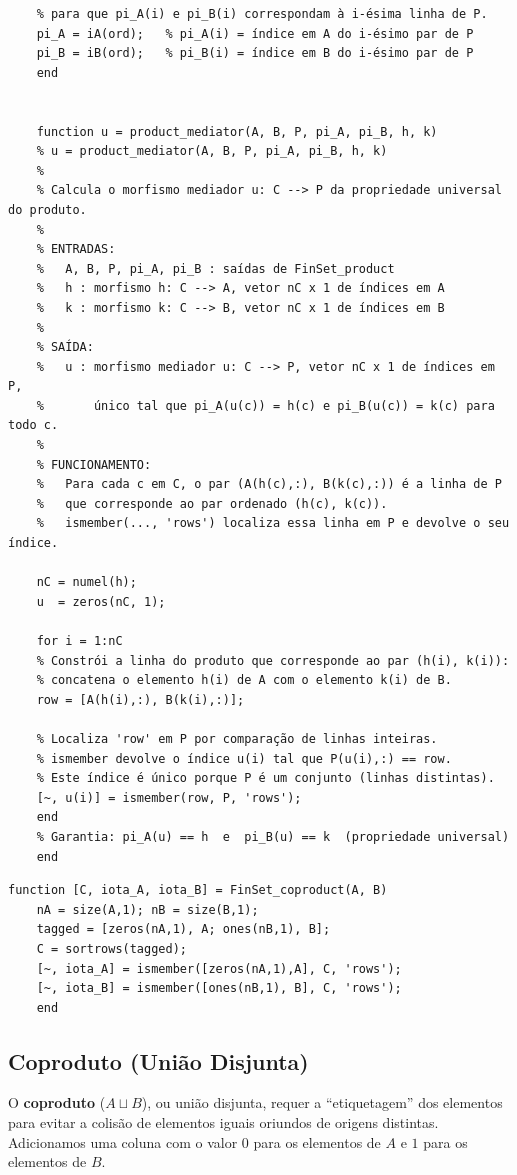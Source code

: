 \begin{lstlisting}[style=matlab, caption={Produto Categórico em FinSet com verificação da propriedade universal}]
	% Reordena os índices de projeção de acordo com a permutação de sortrows,
	% para que pi_A(i) e pi_B(i) correspondam à i-ésima linha de P.
	pi_A = iA(ord);   % pi_A(i) = índice em A do i-ésimo par de P
	pi_B = iB(ord);   % pi_B(i) = índice em B do i-ésimo par de P
	end
	
	
	function u = product_mediator(A, B, P, pi_A, pi_B, h, k)
	% u = product_mediator(A, B, P, pi_A, pi_B, h, k)
	%
	% Calcula o morfismo mediador u: C --> P da propriedade universal do produto.
	%
	% ENTRADAS:
	%   A, B, P, pi_A, pi_B : saídas de FinSet_product
	%   h : morfismo h: C --> A, vetor nC x 1 de índices em A
	%   k : morfismo k: C --> B, vetor nC x 1 de índices em B
	%
	% SAÍDA:
	%   u : morfismo mediador u: C --> P, vetor nC x 1 de índices em P,
	%       único tal que pi_A(u(c)) = h(c) e pi_B(u(c)) = k(c) para todo c.
	%
	% FUNCIONAMENTO:
	%   Para cada c em C, o par (A(h(c),:), B(k(c),:)) é a linha de P
	%   que corresponde ao par ordenado (h(c), k(c)).
	%   ismember(..., 'rows') localiza essa linha em P e devolve o seu índice.
	
	nC = numel(h);
	u  = zeros(nC, 1);
	
	for i = 1:nC
	% Constrói a linha do produto que corresponde ao par (h(i), k(i)):
	% concatena o elemento h(i) de A com o elemento k(i) de B.
	row = [A(h(i),:), B(k(i),:)];
	
	% Localiza 'row' em P por comparação de linhas inteiras.
	% ismember devolve o índice u(i) tal que P(u(i),:) == row.
	% Este índice é único porque P é um conjunto (linhas distintas).
	[~, u(i)] = ismember(row, P, 'rows');
	end
	% Garantia: pi_A(u) == h  e  pi_B(u) == k  (propriedade universal)
	end
\end{lstlisting}

\begin{lstlisting}[style=matlab, caption={Coproduto e Injeções em FinSet}]
	function [C, iota_A, iota_B] = FinSet_coproduct(A, B)
	nA = size(A,1); nB = size(B,1);
	tagged = [zeros(nA,1), A; ones(nB,1), B];
	C = sortrows(tagged);
	[~, iota_A] = ismember([zeros(nA,1),A], C, 'rows');
	[~, iota_B] = ismember([ones(nB,1), B], C, 'rows');
	end
\end{lstlisting}

\subsection{Coproduto (União Disjunta)}

O \textbf{coproduto} ($A \sqcup B$), ou união disjunta, requer
a ``etiquetagem'' dos elementos para evitar a colisão de elementos
iguais oriundos de origens distintas. Adicionamos uma coluna com
o valor $0$ para os elementos de $A$ e $1$ para os elementos de $B$.

